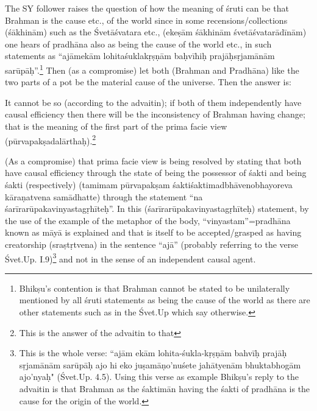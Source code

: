 The SY follower raises the question of how the meaning of śruti can be that Brahman is the cause etc., of the world since in some recensions/collections (śākhinām) such as the Śvetāśvatara etc., (ekeṣām śākhinām śvetāśvatarādīnām) one hears of pradhāna also as being the cause of the world etc., in such statements as “ajāmekām lohitaśuklakṛṣṇām baḥvīhiḥ prajāḥsṛjamānām sarūpāḥ”.\footnote{Bhikṣu’s contention is that Brahman cannot be stated to be unilaterally mentioned by all śruti statements as being the cause of the world as there are other statements such as in the Śvet.Up which say otherwise.} Then (as a compromise) let both  (Brahman and Pradhāna) like the two parts of a pot be the material cause of the universe. Then the answer is:

 It cannot be so (according to the advaitin); if both of them independently have causal efficiency then there will be the inconsistency of Brahman having change; that is the meaning of the first part of the prima facie view (pūrvapakṣadalārthaḥ).\footnote{This is the answer of the advaitin to that }
 
(As a compromise) that prima facie view is being resolved by stating that both have causal efficiency through the state of being the possessor of śakti and being śakti (respectively) (tamimam pūrvapakṣam śaktiśaktimadbhāvenobhayoreva kāraṇatvena samādhatte)  through the statement “na śarīrarūpakavinyastagṛhīteḥ”.  In this (śarīrarūpakavin\-yastagṛhīteḥ) statement, by the use of the example of the metaphor of the body, “vinyastam”=pradhāna known as māyā is explained and that is itself to be accepted/grasped as having creatorship (sraṣtṛtvena) in the sentence “ajā” (probably referring to the verse Śvet.Up. I.9)\footnote{This is the whole verse: “ajām ekām lohita-śukla-kṛṣṇām bahvīḥ prajāḥ sṛjamānām sarūpāḥ ajo hi eko juṣamāṇo’nuśete jahātyenām bhuktabhogām ajo’nyaḥ" (Śvet.Up. 4.5).  Using this verse as example Bhikṣu’s reply to the advaitin is that Brahman as the śaktimān having the śakti of pradhāna is the cause for the origin of the world.} and not in the sense of an independent causal agent. 

\newpage

